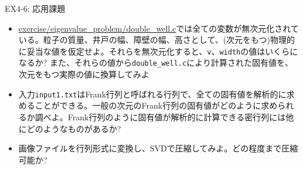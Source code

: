 \documentclass[dvipdfmx]{beamer}
\begin{document}
\begin{frame}[t,fragile]{EX4-6: 応用課題}
  \begin{itemize}
  \item[4-6-1] \href{https://github.com/todo-group/computer-experiments/exercise/eigenvalue_problem/double_well.c}{exercise/eigenvalue\_problem/double\_well.c}では全ての変数が無次元化されている。粒子の質量、井戸の幅、障壁の幅、高さとして、(次元をもつ)物理的に妥当な値を仮定せよ。それらを無次元化すると、{\tt v}、{\tt width}の値はいくらになるか? また、それらの値から{\tt double\_well.c}により計算された固有値を、次元をもつ実際の値に換算してみよ
  \item[4-6-2] 入力{\tt input1.txt}はFrank行列と呼ばれる行列で、全ての固有値を解析的に求めることができる。一般の次元のFrank行列の固有値がどのように求められるか調べよ。Frank行列のように固有値が解析的に計算できる密行列には他にどのようなものがあるか?
  \item[4-6-3] 画像ファイルを行列形式に変換し、SVDで圧縮してみよ。どの程度まで圧縮可能か?
  \end{itemize}
\end{frame}
\end{document}
